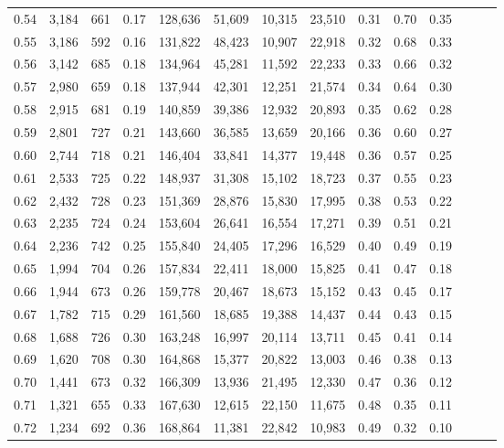 \begin{tabular}{rrrrrrrrrrrrrr}
0.54 &  3,184 &  661 &  0.17 &  128,636 &   51,609 &  10,315 &  23,510 &  0.31 &  0.70 &      0.35 \\
0.55 &  3,186 &  592 &  0.16 &  131,822 &   48,423 &  10,907 &  22,918 &  0.32 &  0.68 &      0.33 \\
0.56 &  3,142 &  685 &  0.18 &  134,964 &   45,281 &  11,592 &  22,233 &  0.33 &  0.66 &      0.32 \\
0.57 &  2,980 &  659 &  0.18 &  137,944 &   42,301 &  12,251 &  21,574 &  0.34 &  0.64 &      0.30 \\
0.58 &  2,915 &  681 &  0.19 &  140,859 &   39,386 &  12,932 &  20,893 &  0.35 &  0.62 &      0.28 \\
0.59 &  2,801 &  727 &  0.21 &  143,660 &   36,585 &  13,659 &  20,166 &  0.36 &  0.60 &      0.27 \\
0.60 &  2,744 &  718 &  0.21 &  146,404 &   33,841 &  14,377 &  19,448 &  0.36 &  0.57 &      0.25 \\
0.61 &  2,533 &  725 &  0.22 &  148,937 &   31,308 &  15,102 &  18,723 &  0.37 &  0.55 &      0.23 \\
0.62 &  2,432 &  728 &  0.23 &  151,369 &   28,876 &  15,830 &  17,995 &  0.38 &  0.53 &      0.22 \\
0.63 &  2,235 &  724 &  0.24 &  153,604 &   26,641 &  16,554 &  17,271 &  0.39 &  0.51 &      0.21 \\
0.64 &  2,236 &  742 &  0.25 &  155,840 &   24,405 &  17,296 &  16,529 &  0.40 &  0.49 &      0.19 \\
0.65 &  1,994 &  704 &  0.26 &  157,834 &   22,411 &  18,000 &  15,825 &  0.41 &  0.47 &      0.18 \\
0.66 &  1,944 &  673 &  0.26 &  159,778 &   20,467 &  18,673 &  15,152 &  0.43 &  0.45 &      0.17 \\
0.67 &  1,782 &  715 &  0.29 &  161,560 &   18,685 &  19,388 &  14,437 &  0.44 &  0.43 &      0.15 \\
0.68 &  1,688 &  726 &  0.30 &  163,248 &   16,997 &  20,114 &  13,711 &  0.45 &  0.41 &      0.14 \\
0.69 &  1,620 &  708 &  0.30 &  164,868 &   15,377 &  20,822 &  13,003 &  0.46 &  0.38 &      0.13 \\
0.70 &  1,441 &  673 &  0.32 &  166,309 &   13,936 &  21,495 &  12,330 &  0.47 &  0.36 &      0.12 \\
0.71 &  1,321 &  655 &  0.33 &  167,630 &   12,615 &  22,150 &  11,675 &  0.48 &  0.35 &      0.11 \\
0.72 &  1,234 &  692 &  0.36 &  168,864 &   11,381 &  22,842 &  10,983 &  0.49 &  0.32 &      0.10 \\

\end{tabular}
